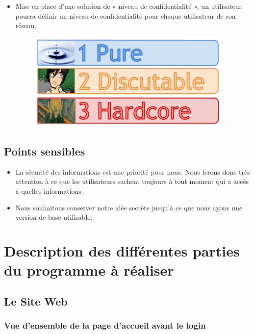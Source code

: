 \documentclass{life-fr}
\begin{document}
\begin{itemize}
  \item Mise en place d’une solution de « niveau de confidentialité », un utilisateur pourra définir un niveau de confidentialité pour chaque utilisateur de son réseau. 

\begin{figure}[H]
  \begin{center}
    \includegraphics[width=10cm]{img/confidentialite.png}
  \end{center}
\end{figure}

\end{itemize}

\section{Points sensibles}

\begin{itemize}
  \item La sécurité des informations est une priorité pour nous. Nous ferons donc très attention à ce que les utilisateurs sachent toujours à tout moment qui a accès à quelles informations.
  \item Nous souhaitons conserver notre idée secrète jusqu’à ce que nous ayons une version de base utilisable.
\end{itemize}

\chapter{Description des différentes parties du programme à réaliser}

\section{Le Site Web}

\subsection{Vue d'ensemble de la page d'accueil avant le login}
\end{document}
